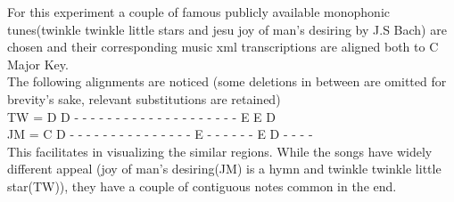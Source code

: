 \noindent For this experiment a couple of famous publicly available monophonic tunes(twinkle twinkle little stars and jesu joy of man's desiring by J.S Bach) are chosen and their corresponding music xml transcriptions are aligned both to C Major Key. \\

\noindent The following alignments are noticed (some deletions in between are omitted for brevity's sake, relevant substitutions are retained) \\

\noindent TW = D D - - - - - - - - - - - - - - - - - - - - E E D \\
\noindent JM = C D - - - - - - - - - - - - - - - E - - - - - - E D - - - - \\ 

\noindent This facilitates in visualizing the similar regions. While the songs have widely different appeal (joy of man's desiring(JM) is a hymn and twinkle twinkle little star(TW)), they have a couple of contiguous notes common in the end.  


 


